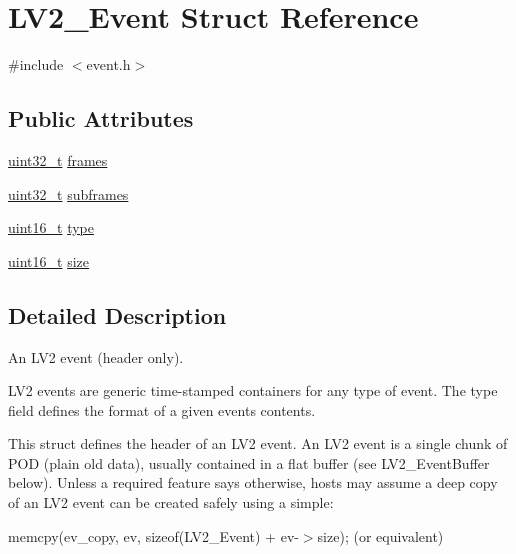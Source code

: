 \hypertarget{struct_l_v2___event}{}\section{L\+V2\+\_\+\+Event Struct Reference}
\label{struct_l_v2___event}


{\ttfamily \#include $<$event.\+h$>$}

\subsection*{Public Attributes}
\begin{DoxyCompactItemize}
\item 
\hyperlink{lib-src_2ffmpeg_2win32_2stdint_8h_a6eb1e68cc391dd753bc8ce896dbb8315}{uint32\+\_\+t} \hyperlink{struct_l_v2___event_ab7de52fc53223b6fe231f4bde89c563d}{frames}
\item 
\hyperlink{lib-src_2ffmpeg_2win32_2stdint_8h_a6eb1e68cc391dd753bc8ce896dbb8315}{uint32\+\_\+t} \hyperlink{struct_l_v2___event_ab6083a09d5433f704de0c94ca4332581}{subframes}
\item 
\hyperlink{lib-src_2ffmpeg_2win32_2stdint_8h_a30af71eaf40c925c9832eb289a48da35}{uint16\+\_\+t} \hyperlink{struct_l_v2___event_a65c8311c5c37ada6b44730e259131f37}{type}
\item 
\hyperlink{lib-src_2ffmpeg_2win32_2stdint_8h_a30af71eaf40c925c9832eb289a48da35}{uint16\+\_\+t} \hyperlink{struct_l_v2___event_a2036cca2f4ebb4f4010f187a78af3f57}{size}
\end{DoxyCompactItemize}


\subsection{Detailed Description}
An L\+V2 event (header only).

L\+V2 events are generic time-\/stamped containers for any type of event. The type field defines the format of a given event\textquotesingle{}s contents.

This struct defines the header of an L\+V2 event. An L\+V2 event is a single chunk of P\+OD (plain old data), usually contained in a flat buffer (see L\+V2\+\_\+\+Event\+Buffer below). Unless a required feature says otherwise, hosts may assume a deep copy of an L\+V2 event can be created safely using a simple\+:

memcpy(ev\+\_\+copy, ev, sizeof(\+L\+V2\+\_\+\+Event) + ev-\/$>$size); (or equivalent) 

